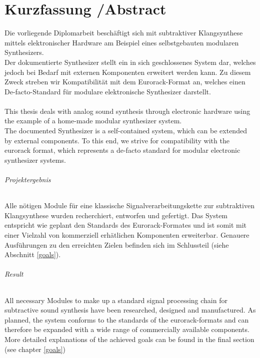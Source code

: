 \chapter*{Kurzfassung /Abstract }
\label{cha:abstract}

Die vorliegende Diplomarbeit beschäftigt sich mit subtraktiver Klangsynthese mittels elektronischer Hardware am Beispiel eines selbstgebauten modularen Synthesizers. \\

Der dokumentierte Synthesizer stellt ein in sich geschlossenes System dar, welches jedoch bei Bedarf mit externen Komponenten erweitert werden kann. Zu diesem Zweck streben wir Kompatibilität mit dem Eurorack-Format an, welches einen De-facto-Standard für modulare elektronische Synthesizer darstellt. \\ \\

This thesis deals with analog sound synthesis through electronic hardware using the example of a home-made modular synthesizer system. \\

The documented Synthesizer is a self-contained system, which can be extended by external components. To this end, we strive for compatibility with the eurorack format, which represents a de-facto standard for modular electronic synthesizer systems. \\

\newpage

\subparagraph{Projektergebnis}
Alle nötigen Module für eine klassische Signalverarbeitungskette zur subtraktiven Klangsynthese wurden recherchiert, entworfen und gefertigt. Das System entspricht wie geplant den Standards des Eurorack-Formates und ist somit mit einer Vielzahl von kommerziell erhätlichen Komponenten erweiterbar. Genauere Ausführungen zu den erreichten Zielen befinden sich im Schlussteil (siehe Abschnitt \ref{goals}).

\subparagraph{Result}
All necessary Modules to make up a standard signal processing chain for subtractive sound synthesis have been researched, designed and manufactured. As planned, the system conforms to the standards of the eurorack-formats and can therefore be expanded with a wide range of commercially available components. More detailed explanations of the achieved goals can be found in the final section (see chapter \ref{goals})

